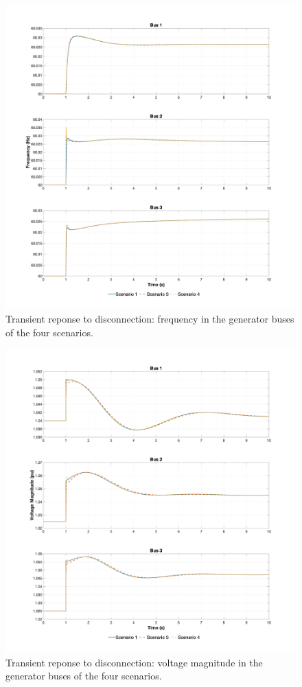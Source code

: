 \begin{figure}[ht!]
    \centering
    \includegraphics[width = \linewidth]{images/omega_disconnection.png}
    \caption{Transient reponse to disconnection: frequency in the generator buses of the four scenarios.}
    \label{fig:omega_disconnection}
\end{figure}

\newpage
\begin{figure}[ht!]
    \centering
    \includegraphics[width = \linewidth]{images/voltage_disconnection.png}
    \caption{Transient reponse to disconnection: voltage magnitude in the generator buses of the four scenarios.}
    \label{fig:voltage_disconnection}
\end{figure}


